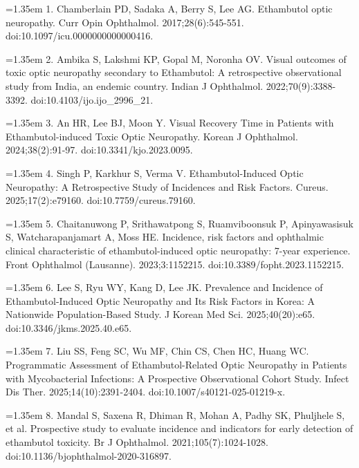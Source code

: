 \documentclass[12pt,a4paper]{article}
\begin{document}
\par\noindent\hangindent=1.35em 1. Chamberlain PD, Sadaka A, Berry S, Lee AG. Ethambutol optic neuropathy. Curr Opin Ophthalmol. 2017;28(6):545-551. doi:10.1097/icu.0000000000000416.\par
\par\noindent\hangindent=1.35em 2. Ambika S, Lakshmi KP, Gopal M, Noronha OV. Visual outcomes of toxic optic neuropathy secondary to Ethambutol: A retrospective observational study from India, an endemic country. Indian J Ophthalmol. 2022;70(9):3388-3392. doi:10.4103/ijo.ijo\_2996\_21.\par
\par\noindent\hangindent=1.35em 3. An HR, Lee BJ, Moon Y. Visual Recovery Time in Patients with Ethambutol-induced Toxic Optic Neuropathy. Korean J Ophthalmol. 2024;38(2):91-97. doi:10.3341/kjo.2023.0095.\par
\par\noindent\hangindent=1.35em 4. Singh P, Karkhur S, Verma V. Ethambutol-Induced Optic Neuropathy: A Retrospective Study of Incidences and Risk Factors. Cureus. 2025;17(2):e79160. doi:10.7759/cureus.79160.\par
\par\noindent\hangindent=1.35em 5. Chaitanuwong P, Srithawatpong S, Ruamviboonsuk P, Apinyawasisuk S, Watcharapanjamart A, Moss HE. Incidence, risk factors and ophthalmic clinical characteristic of ethambutol-induced optic neuropathy: 7-year experience. Front Ophthalmol (Lausanne). 2023;3:1152215. doi:10.3389/fopht.2023.1152215.\par
\par\noindent\hangindent=1.35em 6. Lee S, Ryu WY, Kang D, Lee JK. Prevalence and Incidence of Ethambutol-Induced Optic Neuropathy and Its Risk Factors in Korea: A Nationwide Population-Based Study. J Korean Med Sci. 2025;40(20):e65. doi:10.3346/jkms.2025.40.e65.\par
\par\noindent\hangindent=1.35em 7. Liu SS, Feng SC, Wu MF, Chin CS, Chen HC, Huang WC. Programmatic Assessment of Ethambutol-Related Optic Neuropathy in Patients with Mycobacterial Infections: A Prospective Observational Cohort Study. Infect Dis Ther. 2025;14(10):2391-2404. doi:10.1007/s40121-025-01219-x.\par
\par\noindent\hangindent=1.35em 8. Mandal S, Saxena R, Dhiman R, Mohan A, Padhy SK, Phuljhele S, et al. Prospective study to evaluate incidence and indicators for early detection of ethambutol toxicity. Br J Ophthalmol. 2021;105(7):1024-1028. doi:10.1136/bjophthalmol-2020-316897.\par
\end{document}
